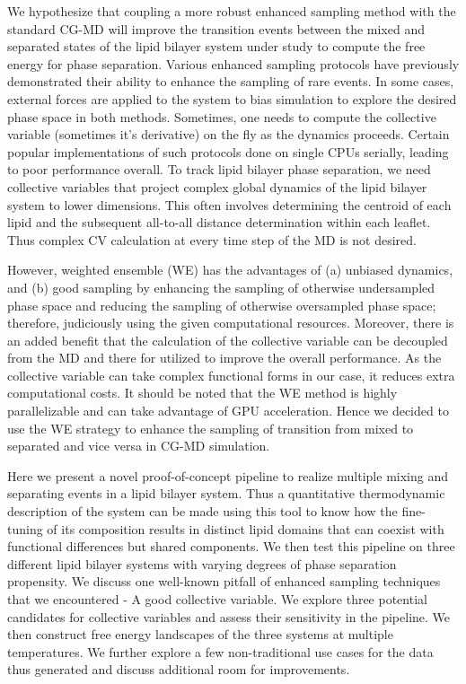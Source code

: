 \documentclass{biophys-new}
\begin{document}
We hypothesize that coupling a more robust enhanced sampling method with the standard CG-MD will improve the transition events between the mixed and separated states of the lipid bilayer system under study to compute the free energy for phase separation.
Various enhanced sampling protocols have previously demonstrated their ability to enhance the sampling of rare events\cite{Henin2022}.
In some cases, external forces are applied to the system to bias simulation to explore the desired phase space in both methods.
Sometimes, one needs to compute the collective variable (sometimes it's derivative) on the fly as the dynamics proceeds.
Certain popular implementations of such protocols done on single CPUs serially, leading to poor performance overall.
To track lipid bilayer phase separation, we need collective variables that project complex global dynamics of the lipid bilayer system to lower dimensions.
This often involves determining the centroid of each lipid and the subsequent all-to-all distance determination within each leaflet.
Thus complex CV calculation at every time step of the MD is not desired.

However, weighted ensemble (WE) has the advantages of (a) unbiased dynamics, and (b) good sampling by enhancing the sampling of otherwise undersampled phase space and reducing the sampling of otherwise oversampled phase space; therefore, judiciously using the given computational resources\cite{Zuckerman2017}.
Moreover, there is an added benefit that the calculation of the collective variable can be decoupled from the MD and there for utilized to improve the overall performance.
As the collective variable can take complex functional forms in our case, it reduces extra computational costs.
It should be noted that the WE method is highly parallelizable and can take advantage of GPU acceleration\cite{Zwier2015}.
Hence we decided to use the WE strategy to enhance the sampling of transition from mixed to separated and vice versa in CG-MD simulation.

Here we present a novel proof-of-concept pipeline to realize multiple mixing and separating events in a lipid bilayer system. 
Thus a quantitative thermodynamic description of the system can be made using this tool to know how the fine-tuning of its composition results in distinct lipid domains that can coexist with functional differences but shared components.
We then test this pipeline on three different lipid bilayer systems with varying degrees of phase separation propensity.
We discuss one well-known pitfall of enhanced sampling techniques that we encountered - A good collective variable.
We explore three potential candidates for collective variables and assess their sensitivity in the pipeline.
We then construct free energy landscapes of the three systems at multiple temperatures.
We further explore a few non-traditional use cases for the data thus generated and discuss additional room for improvements.
\end{document}
